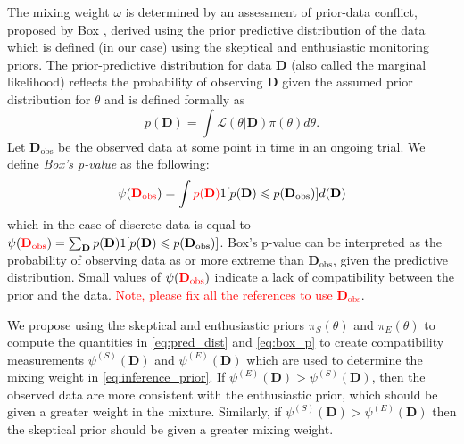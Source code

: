 \documentclass[useAMS,usenatbib,referee]{biom}
\begin{document}
The mixing weight $\omega$ is determined by an assessment of prior-data conflict, proposed by Box \citep{Box1980}, derived using the prior predictive distribution of 
the data which is defined (in our case) using the skeptical and enthusiastic monitoring priors.
The prior-predictive distribution for data $\mathbf{D}$ (also called the marginal likelihood) reflects the probability of observing $\mathbf{D}$ given 
the assumed prior distribution for $\theta$ and is defined formally as
\begin{equation}\label{eq:pred_dist}
p(\mathbf{D})=\int \mathcal{L}(\theta|\mathbf{D})\pi(\theta)d\theta.
\end{equation}
Let $\mathbf{D}_{\text{obs}}$ be the observed data at some point in time in an ongoing trial. 
We define \textit{Box's p-value} as the following:
\begin{equation}\label{eq:box_p}
\psi(\textcolor{red}{\mathbf{D}_{\text{obs}}})=\int \textcolor{red}{p(\mathbf{D})}  1[p(\mathbf{D})\leq p(\mathbf{D}_{\text{obs}})] d(\mathbf{D})
\end{equation}
which in the case of discrete data is equal to $\psi(\textcolor{red}{\mathbf{D}_{\text{obs}}})=\sum_{\mathbf{D}}p(\mathbf{D})1[p(\mathbf{D})\leq p(\mathbf{D}_{\text{obs}})]$.
%
Box's p-value can be interpreted as the probability of observing data as or more extreme than $\mathbf{D}_{\text{obs}}$, given the predictive distribution. 
%
Small values of $\psi(\textcolor{red}{\mathbf{D}_{\text{obs}}})$ indicate a lack of compatibility between the prior and the data. 
%
\textcolor{red}{Note, please fix all the references to use $\mathbf{D}_{\text{obs}}$}.

We propose using the skeptical and enthusiastic priors $\pi_S(\theta)$ and $\pi_E(\theta)$ to compute the quantities in \eqref{eq:pred_dist} and \eqref{eq:box_p} to create compatibility measurements $\psi^{(S)}(\mathbf{D})$ and $\psi^{(E)}(\mathbf{D})$ which are used to determine the mixing weight in \eqref{eq:inference_prior}. 
%
If $\psi^{(E)}(\mathbf{D})>\psi^{(S)}(\mathbf{D})$, then the observed data are more consistent with the enthusiastic prior, which should be given a greater weight in the mixture. Similarly, if $\psi^{(S)}(\mathbf{D})>\psi^{(E)}(\mathbf{D})$ then the skeptical prior should be given a greater mixing weight.
\end{document}
